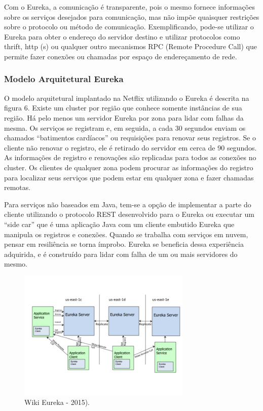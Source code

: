 Com o Eureka, a comunicação é transparente, pois o mesmo fornece informações sobre os serviços desejados para comunicação, mas não impõe quaisquer restrições sobre o protocolo ou método de comunicação. Exemplificando, pode-se utilizar o Eureka para obter o endereço do servidor destino e utilizar protocolos como thrift, http (s) ou qualquer outro mecanismos RPC (Remote Procedure Call) que permite fazer conexões ou chamadas por espaço de endereçamento de rede. 

\subsubsection{Modelo Arquitetural Eureka}
O modelo arquitetural implantado na Netflix utilizando o Eureka é  descrita na figura 6. Existe um cluster por região que conhece somente instâncias de sua região. Há pelo menos um servidor Eureka por zona para lidar com falhas da mesma. Os serviços se registram e, em seguida, a cada 30 segundos enviam os chamados “batimentos cardíacos” ou requisições para renovar seus registros. Se o cliente não renovar o registro, ele é retirado do servidor em cerca de 90 segundos. As informações de registro e renovações são replicadas para todos as conexões no cluster. Os clientes de qualquer zona podem procurar as informações do registro para localizar seus serviços que podem estar em qualquer zona e fazer chamadas remotas.

Para serviços não baseados em Java, tem-se a opção de implementar a parte do cliente utilizando o protocolo REST desenvolvido para o Eureka ou executar um “side car” que é uma aplicação Java com um cliente embutido Eureka que manipula os registros e conexões. Quando se trabalha com serviços em nuvem, pensar em resiliência se torna ímprobo. Eureka se beneficia dessa experiência adquirida, e é construído para lidar com falha de um ou mais servidores do mesmo.

\begin{figure}[h]
\centering
\includegraphics[height=6.2cm]{imagens/figura6}
\caption{Wiki Eureka - 2015).}
\label{fig:exemplo}
\end{figure}







